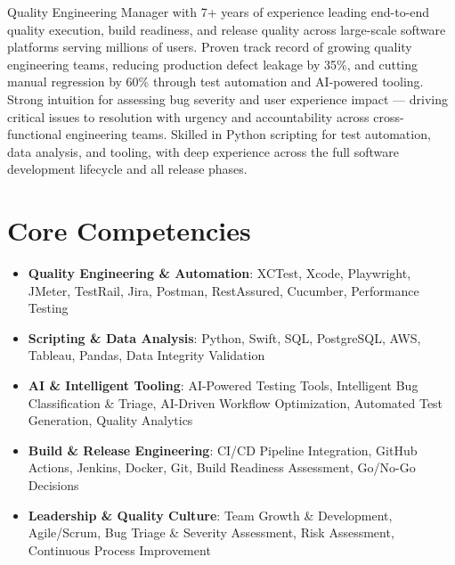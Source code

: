 \documentclass[11pt,a4paper,sans]{moderncv}
\begin{document}
\makecvtitle


\vspace{-10pt}
\small{Quality Engineering Manager with 7+ years of experience leading end-to-end quality execution, build readiness, and release quality across large-scale software platforms serving millions of users. Proven track record of growing quality engineering teams, reducing production defect leakage by 35\%, and cutting manual regression by 60\% through test automation and AI-powered tooling. Strong intuition for assessing bug severity and user experience impact — driving critical issues to resolution with urgency and accountability across cross-functional engineering teams. Skilled in Python scripting for test automation, data analysis, and tooling, with deep experience across the full software development lifecycle and all release phases.}

\vspace{5pt}


\section{Core Competencies}
\vspace{1pt}
\begin{itemize}
\item \textbf{Quality Engineering \& Automation}: XCTest, Xcode, Playwright, JMeter, TestRail, Jira, Postman, RestAssured, Cucumber, Performance Testing
\item \textbf{Scripting \& Data Analysis}: Python, Swift, SQL, PostgreSQL, AWS, Tableau, Pandas, Data Integrity Validation
\item \textbf{AI \& Intelligent Tooling}: AI-Powered Testing Tools, Intelligent Bug Classification \& Triage, AI-Driven Workflow Optimization, Automated Test Generation, Quality Analytics
\item \textbf{Build \& Release Engineering}: CI/CD Pipeline Integration, GitHub Actions, Jenkins, Docker, Git, Build Readiness Assessment, Go/No-Go Decisions
\item \textbf{Leadership \& Quality Culture}: Team Growth \& Development, Agile/Scrum, Bug Triage \& Severity Assessment, Risk Assessment, Continuous Process Improvement
\end{itemize}
\end{document}
